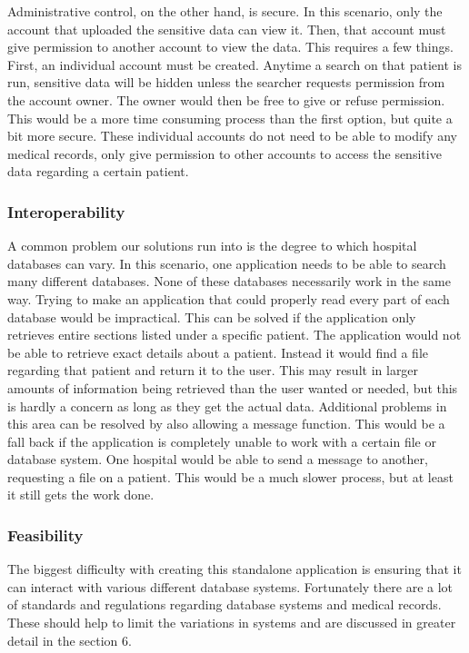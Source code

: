 \documentclass[14pt]{article}
\begin{document}
Administrative control, on the other hand, is secure. In this scenario, only the account that uploaded the sensitive data can view it. Then, that account must give permission to another account to view the data. This requires a few things. First, an individual account must be created. Anytime a search on that patient is run, sensitive data will be hidden unless the searcher requests permission from the account owner. The owner would then be free to give or refuse permission. This would be a more time consuming process than the first option, but quite a bit more secure. These individual accounts do not need to be able to modify any medical records, only give permission to other accounts to access the sensitive data regarding a certain patient.

\subsubsection{Interoperability}
A common problem our solutions run into is the degree to which hospital databases can vary. In this scenario, one application needs to be able to search many different databases. None of these databases necessarily work in the same way. Trying to make an application that could properly read every part of each database would be impractical. This can be solved if the application only retrieves entire sections listed under a specific patient. The application would not be able to retrieve exact details about a patient. Instead it would find a file regarding that patient and return it to the user. This may result in larger amounts of information being retrieved than the user wanted or needed, but this is hardly a concern as long as they get the actual data.
Additional problems in this area can be resolved by also allowing a message function. This would be a fall back if the application is completely unable to work with a certain file or database system. One hospital would be able to send a message to another, requesting a file on a patient. This would be a much slower process, but at least it still gets the work done.

\subsubsection{Feasibility}
The biggest difficulty with creating this standalone application is ensuring that it can interact with various different database systems. Fortunately there are a lot of standards and regulations regarding database systems and medical records. These should help to limit the variations in systems and are discussed in greater detail in the section 6. 
\end{document}
